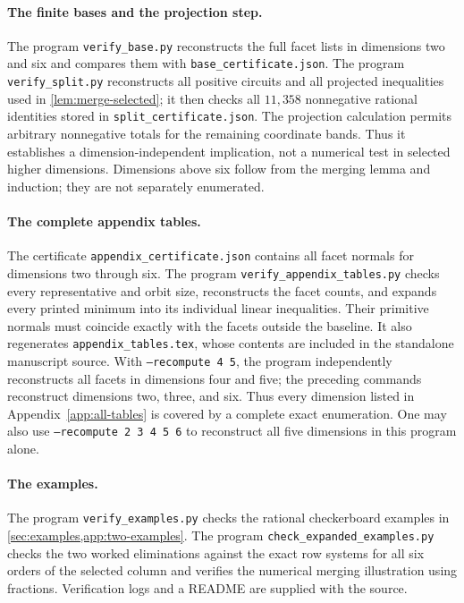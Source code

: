\documentclass[a4paper,11pt]{amsart}
\numberwithin{equation}{section}
\theoremstyle{definition}
\theoremstyle{remark}
\begin{document}
\paragraph{The finite bases and the projection step.}
The program \texttt{verify\_base.py} reconstructs the full facet lists in
dimensions two and six and compares them with
\texttt{base\_certificate.json}. The program
\texttt{verify\_split.py} reconstructs all positive circuits and all
projected inequalities used in \cref{lem:merge-selected}; it then checks
all $11{,}358$ nonnegative rational identities stored in
\texttt{split\_certificate.json}. The projection calculation permits
arbitrary nonnegative totals for the remaining coordinate bands. Thus
it establishes a dimension-independent implication, not a numerical test
in selected higher dimensions. Dimensions above six follow from the
merging lemma and induction; they are not separately enumerated.

\paragraph{The complete appendix tables.}
The certificate \texttt{appendix\_certificate.json} contains all facet
normals for dimensions two through six. The program
\texttt{verify\_appendix\_tables.py} checks every representative and orbit
size, reconstructs the facet counts, and expands every printed minimum
into its individual linear inequalities. Their primitive normals must
coincide exactly with the facets outside the baseline. It also regenerates
\texttt{appendix\_tables.tex}, whose contents are included in the standalone
manuscript source. With \texttt{--recompute 4 5}, the program independently
reconstructs all facets in dimensions four and five; the preceding
commands reconstruct dimensions two, three, and six. Thus every dimension
listed in Appendix~\ref{app:all-tables} is covered by a complete exact
enumeration. One may also use \texttt{--recompute 2 3 4 5 6} to reconstruct
all five dimensions in this program alone.

\paragraph{The examples.}
The program \texttt{verify\_examples.py} checks the rational checkerboard
examples in \cref{sec:examples,app:two-examples}.
The program \texttt{check\_expanded\_examples.py} checks the two worked
eliminations against the exact row systems for all six orders of the
selected column and verifies the numerical merging illustration using
fractions. Verification logs and a README are supplied with the source.
\end{document}
